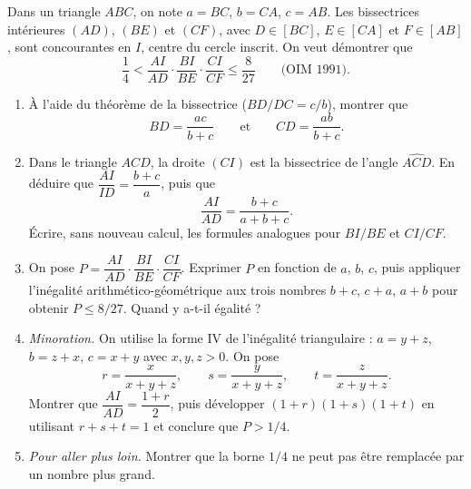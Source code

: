 Dans un triangle $ABC$, on note $a = BC$, $b = CA$, $c = AB$. Les
bissectrices intérieures $(AD)$, $(BE)$ et $(CF)$, avec $D \in [BC]$,
$E \in [CA]$ et $F \in [AB]$, sont concourantes en $I$, centre du cercle
inscrit. On veut démontrer que
\[
\frac14 < \frac{AI}{AD} \cdot \frac{BI}{BE} \cdot \frac{CI}{CF} \leqslant \frac{8}{27}
\qquad \text{(OIM 1991)}.
\]

\begin{center}
\end{center}

\begin{enumerate}
  \item À l'aide du théorème de la bissectrice ($BD/DC = c/b$), montrer que
  \[
  BD = \frac{ac}{b+c} \qquad\text{et}\qquad CD = \frac{ab}{b+c}.
  \]
  \item Dans le triangle $ACD$, la droite $(CI)$ est la bissectrice de
  l'angle $\widehat{ACD}$. En déduire que $\dfrac{AI}{ID} = \dfrac{b+c}{a}$,
  puis que
  \[
  \frac{AI}{AD} = \frac{b+c}{a+b+c}.
  \]
  Écrire, sans nouveau calcul, les formules analogues pour $BI/BE$ et $CI/CF$.
  \item On pose $P = \dfrac{AI}{AD} \cdot \dfrac{BI}{BE} \cdot \dfrac{CI}{CF}$.
  Exprimer $P$ en fonction de $a$, $b$, $c$, puis appliquer l'inégalité
  arithmético-géométrique aux trois nombres $b+c$, $c+a$, $a+b$ pour obtenir
  $P \leqslant 8/27$. Quand y a-t-il égalité ?
  \item \emph{Minoration.} On utilise la forme IV de l'inégalité
  triangulaire : $a = y+z$, $b = z+x$, $c = x+y$ avec $x, y, z > 0$. On pose
  \[
  r = \frac{x}{x+y+z}, \qquad s = \frac{y}{x+y+z}, \qquad t = \frac{z}{x+y+z}.
  \]
  Montrer que $\dfrac{AI}{AD} = \dfrac{1+r}{2}$, puis développer
  $(1+r)(1+s)(1+t)$ en utilisant $r+s+t = 1$ et conclure que $P > 1/4$.
  \item \emph{Pour aller plus loin.} Montrer que la borne $1/4$ ne peut pas
  être remplacée par un nombre plus grand.
\end{enumerate}
